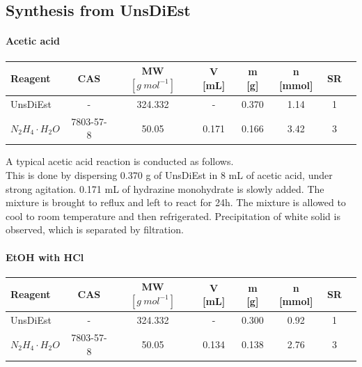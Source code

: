 \documentclass[../Master.tex]{subfiles}
\begin{document}
\subsection{Synthesis from UnsDiEst}

\paragraph{Acetic acid}

\begin{center}
	\begin{tabular}[b]{lccccccc}
		\toprule
		Reagent               & CAS       & MW \([g \ mol^{-1}]\) & V [mL] & m [g] & n [mmol] & SR \\
		\midrule
		UnsDiEst              & -         & 324.332               & -      & 0.370 & 1.14     & 1  \\
		\(N_2H_4 \cdot H_2O\) & 7803-57-8 & 50.05                 & 0.171  & 0.166 & 3.42     & 3  \\
		\bottomrule
	\end{tabular}
\end{center}

A typical acetic acid reaction is conducted as follows.\\
This is done by dispersing 0.370 g of UnsDiEst in 8 mL of acetic acid, under strong agitation. 0.171 mL of hydrazine monohydrate is slowly added. The mixture is brought to reflux and left to react for 24h. The mixture is allowed to cool to room temperature and then refrigerated. Precipitation of white solid is observed, which is separated by filtration.

\newpage
\paragraph{EtOH with HCl}

\begin{center}
	\begin{tabular}[b]{lccccccc}
		\toprule
		Reagent               & CAS       & MW \([g \ mol^{-1}]\) & V [mL] & m [g] & n [mmol] & SR \\
		\midrule
		UnsDiEst              & -         & 324.332               & -      & 0.300 & 0.92     & 1  \\
		\(N_2H_4 \cdot H_2O\) & 7803-57-8 & 50.05                 & 0.134  & 0.138 & 2.76     & 3  \\
		\bottomrule
	\end{tabular}
\end{center}
\end{document}

